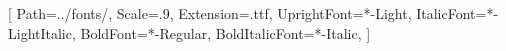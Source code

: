 \usepackage{fontspec}

\setmonofont{CascadiaMono}[
    Path=../fonts/,
    Scale=.9,
    Extension=.ttf,
    UprightFont=*-Light,
    ItalicFont=*-LightItalic,
    BoldFont=*-Regular,
    BoldItalicFont=*-Italic,
]
